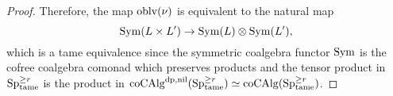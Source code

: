 \begin{proof}
	Therefore, the map $\oblv(\nu)$ is equivalent to the natural map
	$$
	\Sym (L\times L') \to \Sym(L) \otimes \Sym(L'),
	$$
	which is a tame equivalence since the symmetric coalgebra functor $\Sym$ is the cofree coalgebra comonad which preserves products and the tensor product in $\Sp^{\geq r}_{\tame}$ is the product in $\coCAlg^{\divpow,\nil}(\Sp^{\geq r}_{\tame})\simeq \coCAlg(\Sp^{\geq r}_{\tame})$.

\end{proof}













